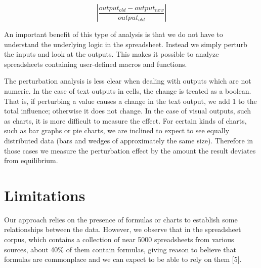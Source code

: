 \[
\left| \frac{output_{old} - output_{new}}{output_{old}} \right|
\]

An important benefit of this type of analysis is that we do not have
to understand the underlying logic in the spreadsheet.  Instead we
simply perturb the inputs and look at the outputs.  This makes it
possible to analyze spreadsheets containing user-defined macros and
functions.

The perturbation analysis is less clear when dealing with outputs
which are not numeric.  In the case of text outputs in cells, the
change is treated as a boolean.  That is, if perturbing a value causes
a change in the text output, we add 1 to the total influence;
otherwise it does not change.  In the case of visual outputs, such as
charts, it is more difficult to measure the effect.  For certain kinds
of charts, such as bar graphs or pie charts, we are inclined to expect
to see equally distributed data (bars and wedges of approximately the
same size). Therefore in those cases we measure the perturbation
effect by the amount the result deviates from equilibrium.

\section{Limitations}

Our approach relies on the presence of formulas or charts to establish
some relationships between the data.  However, we observe that in the
spreadsheet corpus, which contains a collection of near 5000
spreadsheets from various sources, about 40\% of them contain
formulas, giving reason to believe that formulas are commonplace and
we can expect to be able to rely on them [5].
